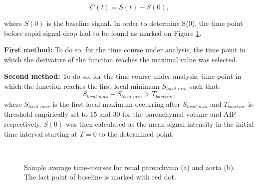\begin{equation}
	\label{eq:conversion}
	C(t) = S(t)-S(0),
\end{equation}
  
where $S(0)$ is the baseline signal. In order to determine S(0), the time point before rapid signal drop had to be found  as marked on Figure \ref{fig:point}.

\textbf{First method:} To do so, for the time course under analysis, the time point in which the derivative of the function reaches the maximal value was selected. 

 
\textbf{Second method:} To do so, for the time course under analysis, time point in which the function reaches the first local minimum $S_{local\_min}$ such that:
\begin{equation}
	\label{eq:local_minimum}
	S_{local\_max} - S_{local\_min} > T_{baseline},
\end{equation}
where $S_{local\_max}$ is the first local maximum occurring after $S_{local\_min}$ and $T_{baseline}$ is threshold empirically set to 15 and 30 for the parenchymal volume and AIF respectively. 
$S(0)$ was then calculated as the mean signal intensity in the initial time interval starting at $T = 0$ to the determined point.

\begin{figure}
	\centering
	\quad
	\\		
\caption{Sample average time-courses for renal parenchyma (a) and aorta (b). The last point of baseline is marked with red dot.}
\label{fig:point}
\end{figure}


